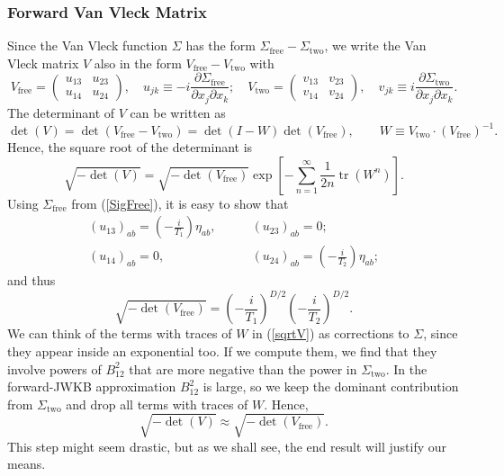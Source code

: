 \subsubsection{Forward Van Vleck Matrix}
Since the Van Vleck function $\Sigma$ has the form $\Sigma_{\text{free}} - \Sigma_{\text{two}}$, we write the Van Vleck matrix $V$ also in the form $V_{\text{free}} - V_{\text{two}}$ with
\begin{equation}
	V_{\text{free}} = \begin{pmatrix}
	u_{1 3} & u_{2 3} \\
	u_{1 4} & u_{2 4}
	\end{pmatrix}, \quad u_{jk} \equiv - i \frac{\partial \Sigma_{\text{free}}}{\partial x_{j} \partial x_{k}}; \quad V_{\text{two}} = \begin{pmatrix}
	v_{1 3} & v_{2 3} \\
	v_{1 4} & v_{2 4}
	\end{pmatrix}, \quad v_{jk} \equiv i \frac{\partial \Sigma_{\text{two}}}{\partial x_{j} \partial x_{k}}.
\end{equation}
The determinant of $V$ can be written as
\begin{equation}
	\det{(V)} = \det(V_{\text{free}} - V_{\text{two}}) = \det{(I - W)} \det{(V_{\text{free}})}, \qquad W \equiv V_{\text{two}} \cdot (V_{\text{free}})^{-1}.
\end{equation}
Hence, the square root of the determinant is
\begin{equation}
	\sqrt{-\det{(V)}} = \sqrt{-\det{(V_{\text{free}})}} \exp{\left[ - \sum_{n = 1}^{\infty} \frac{1}{2 n} \operatorname{tr}{(W^{n})} \right]}.
	\label{sqrtV}
\end{equation}
Using $\Sigma_{\text{free}}$ from (\ref{SigFree}), it is easy to show that
\begin{equation}
\begin{split}
	(u_{13})_{ab} = \left( - \frac{i}{T_{1}} \right) \eta_{ab}, &\qquad (u_{23})_{ab} = 0; \\
	(u_{14})_{ab} = 0, &\qquad (u_{24})_{ab} = \left( - \frac{i}{T_{2}} \right) \eta_{ab};
\end{split}
\end{equation}
and thus
\begin{equation}
	\sqrt{-\det{(V_{\text{free}})}} = \left( - \frac{i}{T_{1}} \right)^{D/2} \left( - \frac{i}{T_{2}} \right)^{D/2}.
\end{equation}
We can think of the terms with traces of $W$ in (\ref{sqrtV}) as corrections to $\Sigma$, since they appear inside an exponential too. If we compute them, we find that they involve powers of $B_{12}^{2}$ that are more negative than the power in $\Sigma_{\text{two}}$. In the forward-JWKB approximation $B_{1 2}^{2}$ is large, so we keep the dominant contribution from $\Sigma_{\text{two}}$ and drop all terms with traces of $W$. Hence,
\begin{equation}
	\sqrt{-\det{(V)}} \approx \sqrt{-\det{(V_{\text{free}})}}.
\end{equation}
This step might seem drastic, but as we shall see, the end result will justify our means.
